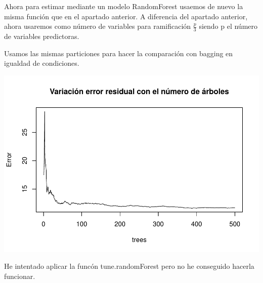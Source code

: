 \documentclass[]{article}
\newenvironment{Shaded}{\begin{snugshade}}{\end{snugshade}}
\newcommand{\KeywordTok}[1]{\textcolor[rgb]{0.13,0.29,0.53}{\textbf{{#1}}}}
\newcommand{\DataTypeTok}[1]{\textcolor[rgb]{0.13,0.29,0.53}{{#1}}}
\newcommand{\DecValTok}[1]{\textcolor[rgb]{0.00,0.00,0.81}{{#1}}}
\newcommand{\StringTok}[1]{\textcolor[rgb]{0.31,0.60,0.02}{{#1}}}
\newcommand{\OtherTok}[1]{\textcolor[rgb]{0.56,0.35,0.01}{{#1}}}
\newcommand{\NormalTok}[1]{{#1}}
\begin{document}
Ahora para estimar mediante un modelo RandomForest usaemos de nuevo la
misma función que en el apartado anterior. A diferencia del apartado
anterior, ahora usaremos como número de variables para ramificación
\(\frac{p}{3}\) siendo p el número de variables predictoras.

Usamos las mismas particiones para hacer la comparación con bagging en
igualdad de condiciones.

\begin{Shaded}
\end{Shaded}

\includegraphics{TrabajoPracticas3_files/figure-latex/unnamed-chunk-55-1.pdf}

He intentado aplicar la funcón tune.randomForest pero no he conseguido
hacerla funcionar.
\end{document}
